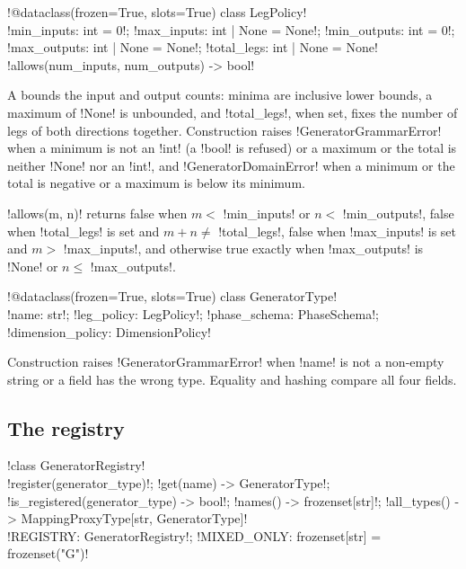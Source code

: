 \begin{signature}
\py!@dataclass(frozen=True, slots=True) class LegPolicy!\\
\quad \py!min_inputs: int = 0!; \py!max_inputs: int | None = None!; \py!min_outputs: int = 0!; \py!max_outputs: int | None = None!; \py!total_legs: int | None = None!\\
\quad \py!allows(num_inputs, num_outputs) -> bool!
\end{signature}

A  bounds the input and output counts: minima are inclusive lower bounds, a maximum of \py!None! is unbounded, and \py!total_legs!, when set, fixes the number of legs of both directions together. Construction raises \py!GeneratorGrammarError! when a minimum is not an \py!int! (a \py!bool! is refused) or a maximum or the total is neither \py!None! nor an \py!int!, and \py!GeneratorDomainError! when a minimum or the total is negative or a maximum is below its minimum.

\begin{algorithm}\label{alg:diagrams-allows}
\py!allows(m, n)! returns false when $m<$ \py!min_inputs! or $n<$ \py!min_outputs!, false when \py!total_legs! is set and $m+n\neq$ \py!total_legs!, false when \py!max_inputs! is set and $m>$ \py!max_inputs!, and otherwise true exactly when \py!max_outputs! is \py!None! or $n\le$ \py!max_outputs!.
\end{algorithm}

\begin{signature}
\py!@dataclass(frozen=True, slots=True) class GeneratorType!\\
\quad \py!name: str!; \py!leg_policy: LegPolicy!; \py!phase_schema: PhaseSchema!; \py!dimension_policy: DimensionPolicy!
\end{signature}

Construction raises \py!GeneratorGrammarError! when \py!name! is not a non-empty string or a field has the wrong type. Equality and hashing compare all four fields.

\subsection{The registry}

\begin{signature}
\py!class GeneratorRegistry!\\
\quad \py!register(generator_type)!; \py!get(name) -> GeneratorType!; \py!is_registered(generator_type) -> bool!; \py!names() -> frozenset[str]!; \py!all_types() -> MappingProxyType[str, GeneratorType]!\\
\py!REGISTRY: GeneratorRegistry!; \py!MIXED_ONLY: frozenset[str] = frozenset({"G"})!
\end{signature}

